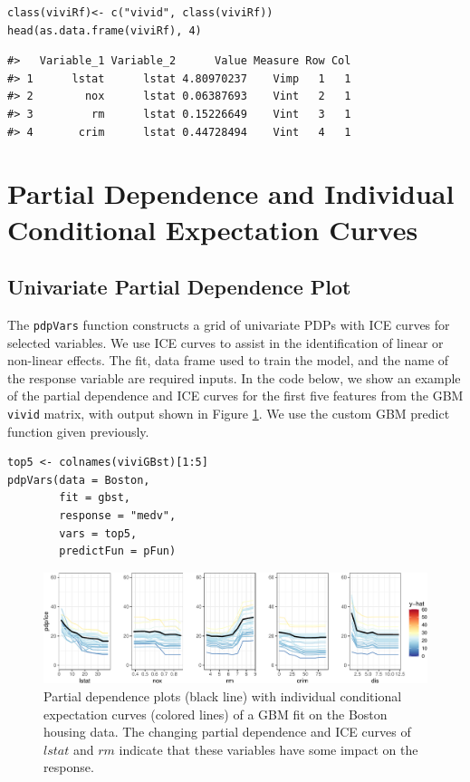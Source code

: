 \begin{verbatim}
class(viviRf)<- c("vivid", class(viviRf)) 
head(as.data.frame(viviRf), 4)
\end{verbatim}

\begin{verbatim}
#>   Variable_1 Variable_2      Value Measure Row Col
#> 1      lstat      lstat 4.80970237    Vimp   1   1
#> 2        nox      lstat 0.06387693    Vint   2   1
#> 3         rm      lstat 0.15226649    Vint   3   1
#> 4       crim      lstat 0.44728494    Vint   4   1
\end{verbatim}

\hypertarget{GPDP}{%
\section{Partial Dependence and Individual Conditional Expectation Curves}\label{GPDP}}

\hypertarget{univariate-partial-dependence-plot}{%
\subsection{Univariate Partial Dependence Plot}\label{univariate-partial-dependence-plot}}

The \texttt{pdpVars} function constructs a grid of univariate PDPs with ICE curves for selected variables. We use ICE curves to assist in the identification of linear or non-linear effects. The fit, data frame used to train the model, and the name of the response variable are required inputs. In the code below, we show an example of the partial dependence and ICE curves for the first five features from the GBM \texttt{vivid} matrix, with output shown in Figure \ref{fig:pdpRf}. We use the custom GBM predict function given previously.

\begin{verbatim}
top5 <- colnames(viviGBst)[1:5]
pdpVars(data = Boston,
        fit = gbst,
        response = "medv",
        vars = top5,
        predictFun = pFun)
\end{verbatim}

\begin{figure}

{\centering \includegraphics[width=1\linewidth]{vivid_files/figure-latex/pdpRf-1} 

}

\caption{Partial dependence plots (black line) with individual conditional expectation curves (colored lines) of a GBM fit on the Boston housing data. The changing partial dependence and ICE curves of $lstat$ and $rm$ indicate that these variables have some impact on the response.}\label{fig:pdpRf}
\end{figure}

